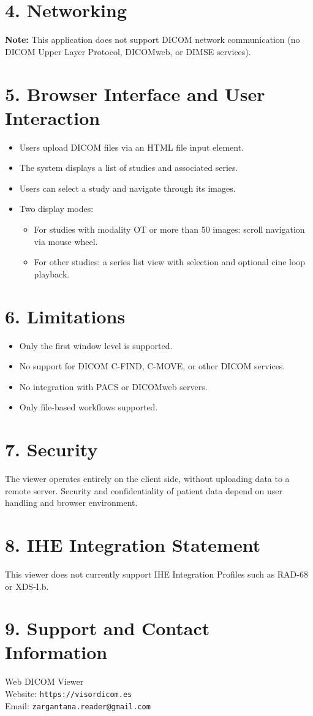 \documentclass[11pt]{article}
\begin{document}
\section*{4. Networking}

\textbf{Note:} This application does not support DICOM network communication (no DICOM Upper Layer Protocol, DICOMweb, or DIMSE services).

\section*{5. Browser Interface and User Interaction}

\begin{itemize}
  \item Users upload DICOM files via an HTML file input element.
  \item The system displays a list of studies and associated series.
  \item Users can select a study and navigate through its images.
  \item Two display modes:
    \begin{itemize}
      \item For studies with modality OT or more than 50 images: scroll navigation via mouse wheel.
      \item For other studies: a series list view with selection and optional cine loop playback.
    \end{itemize}
\end{itemize}

\section*{6. Limitations}

\begin{itemize}
  \item Only the first window level is supported.
  \item No support for DICOM C-FIND, C-MOVE, or other DICOM services.
  \item No integration with PACS or DICOMweb servers.
  \item Only file-based workflows supported.
\end{itemize}

\section*{7. Security}

The viewer operates entirely on the client side, without uploading data to a remote server. Security and confidentiality of patient data depend on user handling and browser environment.

\section*{8. IHE Integration Statement}

This viewer does not currently support IHE Integration Profiles such as RAD-68 or XDS-I.b.

\section*{9. Support and Contact Information}

Web DICOM Viewer \\
Website: \texttt{https://visordicom.es} \\
Email: \texttt{zargantana.reader@gmail.com}
\end{document}
